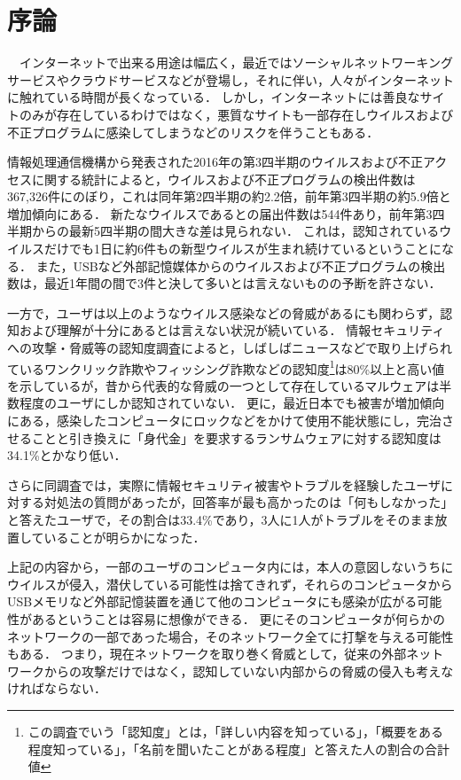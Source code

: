 \chapter{序論}

　インターネットで出来る用途は幅広く，最近ではソーシャルネットワーキングサービスやクラウドサービスなどが登場し，それに伴い，人々がインターネットに触れている時間が長くなっている．
しかし，インターネットには善良なサイトのみが存在しているわけではなく，悪質なサイトも一部存在しウイルスおよび不正プログラムに感染してしまうなどのリスクを伴うこともある．

情報処理通信機構から発表された2016年の第3四半期のウイルスおよび不正アクセスに関する統計によると，ウイルスおよび不正プログラムの検出件数は367,326件にのぼり，これは同年第2四半期の約2.2倍，前年第3四半期の約5.9倍と増加傾向にある\cite{joron2}．
新たなウイルスであるとの届出件数は544件あり，前年第3四半期からの最新5四半期の間大きな差は見られない．
これは，認知されているウイルスだけでも1日に約6件もの新型ウイルスが生まれ続けているということになる．
また，USBなど外部記憶媒体からのウイルスおよび不正プログラムの検出数は，最近1年間の間で3件と決して多いとは言えないものの予断を許さない．

一方で，ユーザは以上のようなウイルス感染などの脅威があるにも関わらず，認知および理解が十分にあるとは言えない状況が続いている．
情報セキュリティへの攻撃・脅威等の認知度調査\cite{joron1}によると，しばしばニュースなどで取り上げられているワンクリック詐欺やフィッシング詐欺などの認知度\footnote{この調査でいう「認知度」とは，「詳しい内容を知っている」，「概要をある程度知っている」，「名前を聞いたことがある程度」と答えた人の割合の合計値}は80\%以上と高い値を示しているが，昔から代表的な脅威の一つとして存在しているマルウェアは半数程度のユーザにしか認知されていない．
更に，最近日本でも被害が増加傾向にある，感染したコンピュータにロックなどをかけて使用不能状態にし，完治させることと引き換えに「身代金」を要求するランサムウェア\cite{ransomware}に対する認知度は34.1\%とかなり低い．

さらに同調査では，実際に情報セキュリティ被害やトラブルを経験したユーザに対する対処法の質問があったが，回答率が最も高かったのは「何もしなかった」と答えたユーザで，その割合は33.4\%であり，3人に1人がトラブルをそのまま放置していることが明らかになった\cite{joron1}．

上記の内容から，一部のユーザのコンピュータ内には，本人の意図しないうちにウイルスが侵入，潜伏している可能性は捨てきれず，それらのコンピュータからUSBメモリなど外部記憶装置を通じて他のコンピュータにも感染が広がる可能性があるということは容易に想像ができる．
更にそのコンピュータが何らかのネットワークの一部であった場合，そのネットワーク全てに打撃を与える可能性もある．
つまり，現在ネットワークを取り巻く脅威として，従来の外部ネットワークからの攻撃だけではなく，認知していない内部からの脅威の侵入も考えなければならない．

